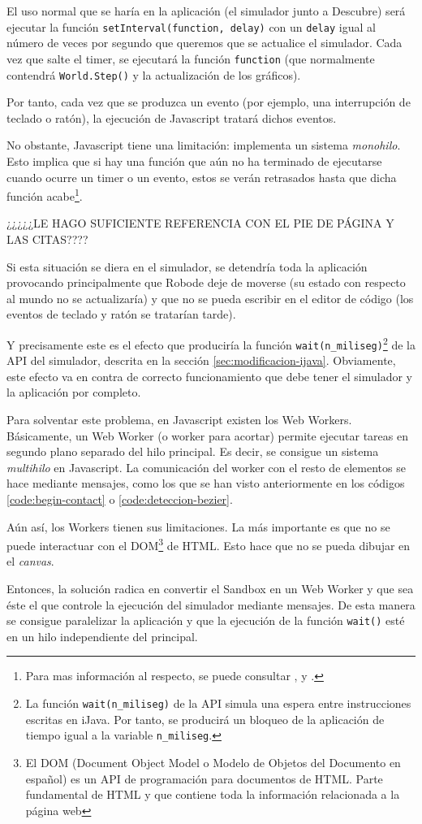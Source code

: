 El uso normal que se haría en la aplicación (el simulador junto a Descubre) será ejecutar la función \texttt{setInterval(function, delay)} con un \texttt{delay} igual al número de veces por segundo que queremos que se actualice el simulador. Cada vez que salte el timer, se ejecutará la función \texttt{function} (que normalmente contendrá \texttt{World.Step()} y la actualización de los gráficos).

Por tanto, cada vez que se produzca un evento (por ejemplo, una interrupción de teclado o ratón), la ejecución de Javascript tratará dichos eventos. 

No obstante, Javascript tiene una limitación: implementa un sistema \emph{monohilo}. Esto implica que si hay una función que aún no ha terminado de ejecutarse cuando ocurre un timer o un evento, estos se verán retrasados hasta que dicha función acabe\footnote{Para mas información al respecto, se puede consultar \cite{js-timers-works}, \cite{event-loop-js} y \cite{resig2013secrets}.}.

{\color{red} ¿¿¿¿¿LE HAGO SUFICIENTE REFERENCIA CON EL PIE DE PÁGINA Y LAS CITAS????}

Si esta situación se diera en el simulador, se detendría toda la aplicación provocando principalmente que Robode deje de moverse (su estado con respecto al mundo no se actualizaría) y que no se pueda escribir en el editor de código (los eventos de teclado y ratón se tratarían tarde).

Y precisamente este es el efecto que produciría la función \texttt{wait(n\_miliseg)}\footnote{La función \texttt{wait(n\_miliseg)} de la API simula una espera entre instrucciones escritas en iJava. Por tanto, se producirá un bloqueo de la aplicación de tiempo igual a la variable \texttt{n\_miliseg}.} de la API del simulador, descrita en la sección \ref{sec:modificacion-ijava}. Obviamente, este efecto va en contra de correcto funcionamiento que debe tener el simulador y la aplicación por completo.

Para solventar este problema, en Javascript existen los Web Workers\cite{web-worker-mdn}. Básicamente, un Web Worker (o worker para acortar) permite ejecutar tareas en segundo plano separado del hilo principal. Es decir, se consigue un sistema \emph{multihilo} en Javascript. La comunicación del worker con el resto de elementos se hace mediante mensajes, como los que se han visto anteriormente en los códigos \ref{code:begin-contact} o \ref{code:deteccion-bezier}.

{\color{red}
Aún así, los Workers tienen sus limitaciones. La más importante es que no se puede interactuar con el DOM\footnote{El DOM (Document Object Model o Modelo de Objetos del Documento en español) es un API de programación para documentos de HTML. Parte fundamental de HTML y que contiene toda la información relacionada a la página web} de HTML. Esto hace que no se pueda dibujar en el \emph{canvas}. 

Entonces, la solución radica en convertir el Sandbox en un Web Worker y que sea éste el que controle la ejecución del simulador mediante mensajes. De esta manera se consigue paralelizar la aplicación y que la ejecución de la función \texttt{wait()} esté en un hilo independiente del principal. 
}


